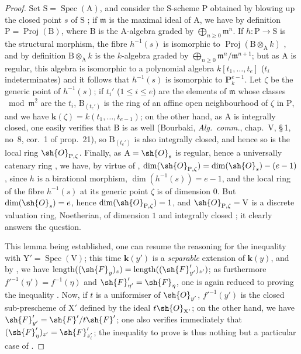 \begin{proof}
Set $\mathrm{S}=\operatorname{Spec}(\mathrm{A})$, and consider the $\mathrm{S}$-scheme $\mathrm{P}$ obtained by blowing up the closed point $s$ of $\mathrm{S}$ ; if $\mathfrak{m}$ is the maximal ideal of $\mathrm{A}$, we have by definition $\mathrm{P}=\operatorname{Proj}(\mathrm{B})$, where $\mathrm{B}$ is the $\mathrm{A}$-algebra graded by $\bigoplus_{n\geqslant 0}\mathfrak{m}^n$.
If $h:\mathrm{P}\to\mathrm{S}$ is the structural morphism, the fibre $h^{-1}(s)$ is isomorphic to $\operatorname{Proj}(\mathrm{B}\otimes_\mathrm{A} k)$ , and by definition $\mathrm{B}\otimes_\mathrm{A} k$ is the $k$-algebra graded by $\bigoplus_{n\geqslant 0}\mathfrak{m}^n/\mathfrak{m}^{n+1}$; but as $\mathrm{A}$ is regular, this algebra is isomorphic to a polynomial algebra $k[t_1,\ldots,t_e]$ ($t_i$ indeterminates)  and it follows that $h^{-1}(s)$ is isomorphic to $\mathbf{P}_k^{e-1}$.
Let $\zeta$ be the generic point of $h^{-1}(s)$; if $t_i'$ ($1\leqslant i\leqslant e$) are the elements of $\mathfrak{m}$ whose classes $\bmod\mathfrak{m}^2$ are the $t_i$, $\mathrm{B}_{(t_e')}$ is the ring of an affine open neighbourhood of $\zeta$ in $\mathrm{P}$, and we have $\mathbf{k}(\zeta)=k(t_1,\ldots,t_{e-1})$; on the other hand, as $\mathrm{A}$ is integrally closed, one easily verifies that $\mathrm{B}$ is as well (Bourbaki, \emph{Alg.\ comm.}, chap.~V, \S\,1, no~8, cor.~1 of prop.~21), so $\mathrm{B}_{(t_e')}$ is also integrally closed, and hence so is the local ring $\sh{O}_{\mathrm{P},\zeta}$.
Finally, as $\mathrm{A}=\sh{O}_s$ is regular, hence a universally catenary ring , we have, by virtue of , $\dim(\sh{O}_{\mathrm{P},\zeta})=\dim(\sh{O}_s)-(e-1)$, since $h$ is a birational morphism, $\dim(h^{-1}(s))=e-1$, and the local ring of the fibre $h^{-1}(s)$ at its generic point $\zeta$ is of dimension $0$.
But $\dim(\sh{O}_s)=e$, hence $\dim(\sh{O}_{\mathrm{P},\zeta})=1$, and $\sh{O}_{\mathrm{P},\zeta}=\mathrm{V}$ is a discrete valuation ring, Noetherian, of dimension $1$ and integrally closed ; it clearly answers the question.

This lemma being established, one can resume the reasoning for the inequality  with $\mathrm{Y}'=\operatorname{Spec}(\mathrm{V})$; this time $\mathbf{k}(y')$ is a \emph{separable} extension of $\mathbf{k}(y)$, and by , we have $\operatorname{length}((\sh{F}_y)_z)=\operatorname{length}((\sh{F}_{y'}')_{z'})$; as furthermore $f'^{-1}(\eta')=f^{-1}(\eta)$ and $\sh{F}_{\eta'}'=\sh{F}_\eta$, one is again reduced to proving the inequality .
Now, if $t$ is a uniformiser of $\sh{O}_{y'}$, $f'^{-1}(y')$ is the closed sub-prescheme of $\mathrm{X}'$ defined by the ideal $t\sh{O}_{\mathrm{X}'}$; on the other hand, we have $\sh{F}_{y'}'=\sh{F}'/t\sh{F}'$; one also verifies immediately  that $(\sh{F}_\eta')_{z'}=\sh{F}_{z_i'}'$; the inequality to prove  is thus nothing but a particular case of .
\end{proof}

